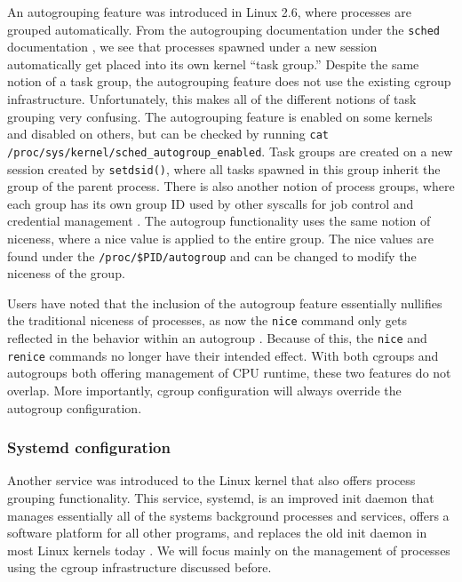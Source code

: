 \documentclass[12pt]{article}
\def\ind{\hspace*{0.3in}}
\begin{document}
\ind An autogrouping feature was introduced in Linux 2.6, where processes are grouped automatically. From the autogrouping documentation under the \texttt{sched} documentation \cite{SchedLinuxManual}, we see that processes spawned under a new session automatically get placed into its own kernel ``task group.'' Despite the same notion of a task group, the autogrouping feature does not use the existing cgroup infrastructure. Unfortunately, this makes all of the different notions of task grouping very confusing. The autogrouping feature is enabled on some kernels and disabled on others, but can be checked by running \texttt{cat /proc/sys/kernel/sched\_autogroup\_enabled}. Task groups are created on a new session created by \texttt{setdsid()}, where all tasks spawned in this group inherit the group of the parent process. There is also another notion of process groups, where each group has its own group ID used by other syscalls for job control and credential management \cite{CredentialsLinuxManual, troanProcessModelLinux2005}. The autogroup functionality uses the same notion of niceness, where a nice value is applied to the entire group. The nice values are found under the \texttt{/proc/\$PID/autogroup} and can be changed to modify the niceness of the group. 

Users have noted that the inclusion of the autogroup feature essentially nullifies the traditional niceness of processes, as now the \texttt{nice} command only gets reflected in the behavior within an autogroup \cite{nburginWhyNiceLevels2019}. Because of this, the \texttt{nice} and \texttt{renice} commands no longer have their intended effect. 
With both cgroups and autogroups both offering management of CPU runtime, these two features do not overlap. More importantly, cgroup configuration will always override the autogroup configuration.

\subsubsection*{Systemd configuration}

\ind Another service was introduced to the Linux kernel that also offers process grouping functionality. This service, systemd, is an improved init daemon that manages essentially all of the systems background processes and services, offers a software platform for all other programs, and replaces the old init daemon in most Linux kernels today \cite{Systemd2020}. We will focus mainly on the management of processes using the cgroup infrastructure discussed before.
\end{document}

